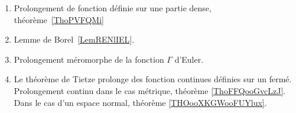 	\label{THEMEooProlongementAppli}

\begin{enumerate}
	\item Prolongement de fonction définie sur une partie dense, théorème~\ref{ThoPVFQMi}
	\item Lemme de Borel~\ref{LemRENlIEL}.
	\item Prolongement méromorphe de la fonction \( \Gamma\) d'Euler.
    	\item Le théorème de Tietze prolonge des fonction continues définies sur un fermé. Prolongement continu dans le cas métrique, théorème \ref{ThoFFQooGvcLzJ}. Dans le cas d'un espace normal, théorème \ref{THOooXKGWooFUYlux}.
\end{enumerate}
